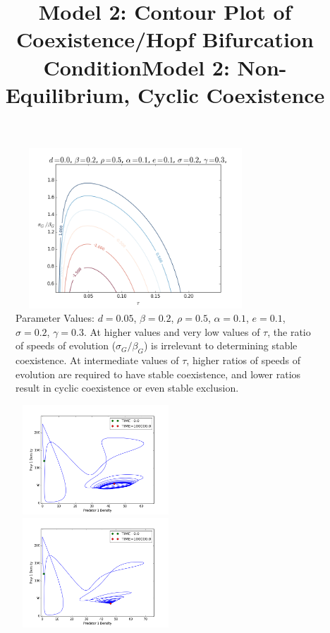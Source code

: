 \documentclass{amsart}
\theoremstyle{definition}
\theoremstyle{remark}
\numberwithin{equation}{section}
\begin{document}
\begin{centering}
	\begin{figure}
		\title{\bf Model 2: Contour Plot of Coexistence/Hopf Bifurcation Condition}
		\includegraphics[width=9cm,height=6cm]{figures/1x1/variable_growth/contour_plots/tau_ratio_150417_125636.png}
		\caption{\footnotesize Parameter Values: $d = 0.05$, $\beta = 0.2$, $\rho = 0.5$, $\alpha = 0.1$, $e = 0.1$, $\sigma = 0.2$, $\gamma = 0.3$.  At higher values and very low values of $\tau$, the ratio of speeds of evolution ($\sigma_G/\beta_G$) is irrelevant to determining stable coexistence.  At intermediate values of $\tau$, higher ratios of speeds of evolution are required to have stable coexistence, and lower ratios result in cyclic coexistence or even stable exclusion.}
		\label{fig:contour_plot}
	\end{figure}
	\begin{figure}
		\title{\bf Model 2: Non-Equilibrium, Cyclic Coexistence}
		\includegraphics[width=6cm,height=4.1cm]{figures/1x1/variable_growth/contour_plots/density_phase_plane_limit_cycle.png}
		\includegraphics[width=6cm,height=4.1cm]{figures/1x1/variable_growth/contour_plots/density_phase_plane_node.png}

\end{figure}
\end{centering}
\end{document}
